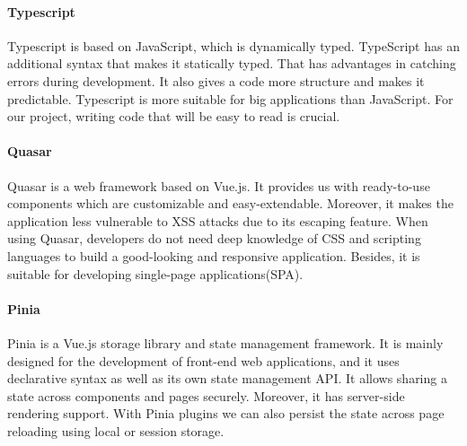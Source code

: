 \paragraph*{Typescript} Typescript is based on JavaScript, which is dynamically typed. TypeScript has an additional syntax that makes it statically typed. That has advantages in catching errors during development. It also gives a code more structure and makes it predictable. Typescript is more suitable for big applications than JavaScript. For our project, writing code that will be easy to read is crucial.\cite{typescript-doc}

\paragraph*{Quasar} Quasar is a web framework based on Vue.js. It provides us with ready-to-use components which are customizable and easy-extendable. Moreover, it makes the application less vulnerable to XSS attacks due to its escaping feature. When using Quasar, developers do not need deep knowledge of CSS and scripting languages to build a good-looking  and responsive application. Besides, it is suitable for developing single-page applications(SPA).\cite{quasar-doc}

\paragraph*{Pinia} Pinia is a Vue.js storage library and state management framework. It is mainly designed for the development of front-end web applications, and it uses declarative syntax as well as its own state management API.
It allows sharing a state across components and pages securely. Moreover, it has server-side rendering support. With Pinia plugins we can also persist the state across page reloading using local or session storage.\cite{pinia-wiki}

